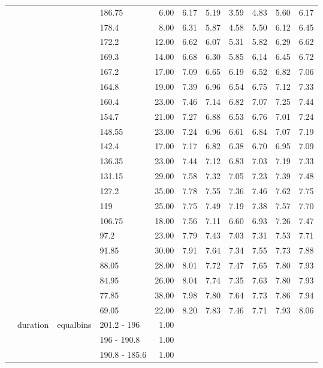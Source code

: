 \begin{longtable}{llllrrrrrrr}
   &  &  & 186.75 & 6.00 & 6.17 & 5.19 & 3.59 & 4.83 & 5.60 & 6.17 \\ 
   &  &  & 178.4 & 8.00 & 6.31 & 5.87 & 4.58 & 5.50 & 6.12 & 6.45 \\ 
   &  &  & 172.2 & 12.00 & 6.62 & 6.07 & 5.31 & 5.82 & 6.29 & 6.62 \\ 
   &  &  & 169.3 & 14.00 & 6.68 & 6.30 & 5.85 & 6.14 & 6.45 & 6.72 \\ 
   &  &  & 167.2 & 17.00 & 7.09 & 6.65 & 6.19 & 6.52 & 6.82 & 7.06 \\ 
   &  &  & 164.8 & 19.00 & 7.39 & 6.96 & 6.54 & 6.75 & 7.12 & 7.33 \\ 
   &  &  & 160.4 & 23.00 & 7.46 & 7.14 & 6.82 & 7.07 & 7.25 & 7.44 \\ 
   &  &  & 154.7 & 21.00 & 7.27 & 6.88 & 6.53 & 6.76 & 7.01 & 7.24 \\ 
   &  &  & 148.55 & 23.00 & 7.24 & 6.96 & 6.61 & 6.84 & 7.07 & 7.19 \\ 
   &  &  & 142.4 & 17.00 & 7.17 & 6.82 & 6.38 & 6.70 & 6.95 & 7.09 \\ 
   &  &  & 136.35 & 23.00 & 7.44 & 7.12 & 6.83 & 7.03 & 7.19 & 7.33 \\ 
   &  &  & 131.15 & 29.00 & 7.58 & 7.32 & 7.05 & 7.23 & 7.39 & 7.48 \\ 
   &  &  & 127.2 & 35.00 & 7.78 & 7.55 & 7.36 & 7.46 & 7.62 & 7.75 \\ 
   &  &  & 119 & 25.00 & 7.75 & 7.49 & 7.19 & 7.38 & 7.57 & 7.70 \\ 
   &  &  & 106.75 & 18.00 & 7.56 & 7.11 & 6.60 & 6.93 & 7.26 & 7.47 \\ 
   &  &  & 97.2 & 23.00 & 7.79 & 7.43 & 7.03 & 7.31 & 7.53 & 7.71 \\ 
   &  &  & 91.85 & 30.00 & 7.91 & 7.64 & 7.34 & 7.55 & 7.73 & 7.88 \\ 
   &  &  & 88.05 & 28.00 & 8.01 & 7.72 & 7.47 & 7.65 & 7.80 & 7.93 \\ 
   &  &  & 84.95 & 26.00 & 8.04 & 7.74 & 7.35 & 7.63 & 7.80 & 7.93 \\ 
   &  &  & 77.85 & 38.00 & 7.98 & 7.80 & 7.64 & 7.73 & 7.86 & 7.94 \\ 
   &  &  & 69.05 & 22.00 & 8.20 & 7.83 & 7.46 & 7.71 & 7.93 & 8.06 \\ 
   & duration & equalbins & 201.2 - 196 & 1.00 &  &  &  &  &  &  \\ 
   &  &  & 196 - 190.8 & 1.00 &  &  &  &  &  &  \\ 
   &  &  & 190.8 - 185.6 & 1.00 &  &  &  &  &  &  \\ 

\end{longtable}
